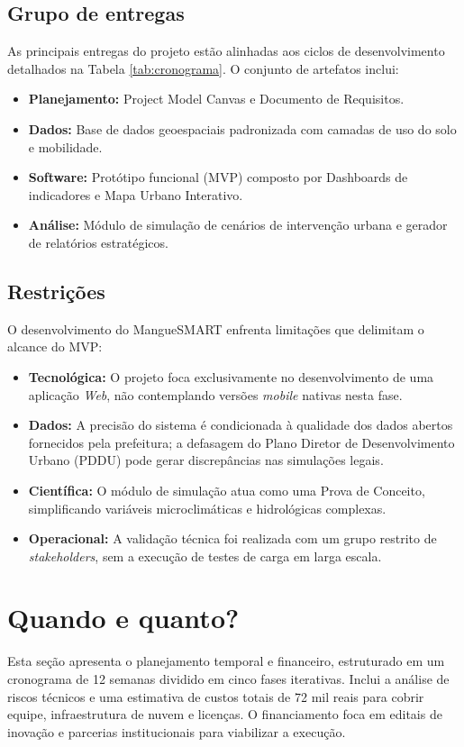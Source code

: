 \documentclass[12pt]{article}
\begin{document}
\subsection{Grupo de entregas}
As principais entregas do projeto estão alinhadas aos ciclos de desenvolvimento detalhados na Tabela \ref{tab:cronograma}. O conjunto de artefatos inclui:
\begin{itemize}
    \item \textbf{Planejamento:} Project Model Canvas e Documento de Requisitos.
    \item \textbf{Dados:} Base de dados geoespaciais padronizada com camadas de uso do solo e mobilidade.
    \item \textbf{Software:} Protótipo funcional (MVP) composto por Dashboards de indicadores e Mapa Urbano Interativo.
    \item \textbf{Análise:} Módulo de simulação de cenários de intervenção urbana e gerador de relatórios estratégicos.
\end{itemize}

\subsection{Restrições}
O desenvolvimento do MangueSMART enfrenta limitações que delimitam o alcance do MVP:
\begin{itemize}
    \item \textbf{Tecnológica:} O projeto foca exclusivamente no desenvolvimento de uma aplicação \textit{Web}, não contemplando versões \textit{mobile} nativas nesta fase.
    \item \textbf{Dados:} A precisão do sistema é condicionada à qualidade dos dados abertos fornecidos pela prefeitura; a defasagem do Plano Diretor de Desenvolvimento Urbano (PDDU) pode gerar discrepâncias nas simulações legais.
    \item \textbf{Científica:} O módulo de simulação atua como uma Prova de Conceito, simplificando variáveis microclimáticas e hidrológicas complexas.
    \item \textbf{Operacional:} A validação técnica foi realizada com um grupo restrito de \textit{stakeholders}, sem a execução de testes de carga em larga escala.
\end{itemize}

\section{Quando e quanto?} \label{sec:quandoquanto}
Esta seção apresenta o planejamento temporal e financeiro, estruturado em um cronograma de 12 semanas dividido em cinco fases iterativas. Inclui a análise de riscos técnicos e uma estimativa de custos totais de 72 mil reais para cobrir equipe, infraestrutura de nuvem e licenças. O financiamento foca em editais de inovação e parcerias institucionais para viabilizar a execução.
\end{document}
